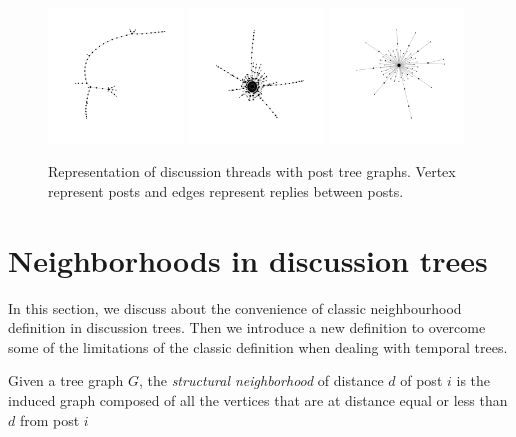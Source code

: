 \documentclass[smallextended]{svjour3}          %
\begin{document}
\begin{figure}
	\centering
	\includegraphics[width=0.32\textwidth]{tree1}
	\includegraphics[width=0.32\textwidth]{tree2}
	\includegraphics[width=0.32\textwidth]{tree3}
	\caption{Representation of discussion threads with post tree graphs. Vertex represent posts and edges represent replies between posts.}
	\label{fig:trees}
\end{figure}

\section{Neighborhoods in discussion trees}
In this section, we discuss about the convenience of classic neighbourhood definition in discussion trees. Then we introduce a new definition to overcome some of the limitations of the classic definition when dealing with temporal trees.

\begin{definition}
Given a tree graph $G$, the \textit{structural neighborhood} of distance $d$ of post $i$ is the induced graph composed of all the vertices that are at distance equal or less than $d$ from post $i$
\end{definition}
\end{document}

